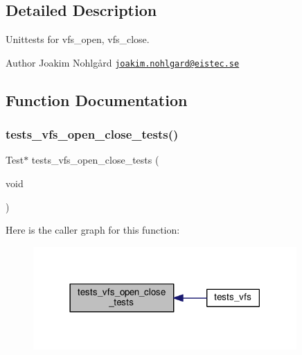 \subsection{Detailed Description}
Unittests for vfs\+\_\+open, vfs\+\_\+close. 

\begin{DoxyAuthor}{Author}
Joakim Nohlgård \href{mailto:joakim.nohlgard@eistec.se}{\tt joakim.\+nohlgard@eistec.\+se} 
\end{DoxyAuthor}


\subsection{Function Documentation}
\mbox{\label{tests-vfs-open-close_8c_a1431c12e4a6d8b993b1c7ca0c93f9b26}} 
\subsubsection{\texorpdfstring{tests\+\_\+vfs\+\_\+open\+\_\+close\+\_\+tests()}{tests\_vfs\_open\_close\_tests()}}
{\footnotesize\ttfamily Test$\ast$ tests\+\_\+vfs\+\_\+open\+\_\+close\+\_\+tests (\begin{DoxyParamCaption}\item[{void}]{ }\end{DoxyParamCaption})}

Here is the caller graph for this function\+:
\nopagebreak
\begin{figure}[H]
\begin{center}
\leavevmode
\includegraphics[width=285pt]{tests-vfs-open-close_8c_a1431c12e4a6d8b993b1c7ca0c93f9b26_icgraph}
\end{center}
\end{figure}
